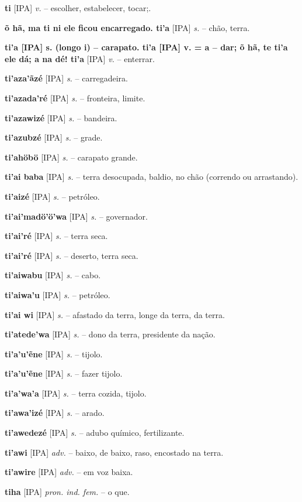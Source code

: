 \textbf{ti} [IPA] \textit{v.} -- escolher, estabelecer, tocar;.

\textbf{õ hã, ma ti ni ele ficou encarregado. ti'a} [IPA] \textit{s.} -- chão, terra.

\textbf{ti'a [IPA] s. (longo i) -- carapato. ti'a [IPA]  v. = a -- dar; õ hã, te ti'a ele dá; a na dé! ti'a} [IPA] \textit{v.} -- enterrar.

\textbf{ti'aza'ãzé} [IPA] \textit{s.} -- carregadeira.

\textbf{ti'azada'ré} [IPA] \textit{s.} -- fronteira, limite.

\textbf{ti'azawizé} [IPA] \textit{s.} -- bandeira.

\textbf{ti'azubzé} [IPA] \textit{s.} -- grade.

\textbf{ti'ahöbö} [IPA] \textit{s.} -- carapato grande.

\textbf{ti'ai baba} [IPA] \textit{s.} -- terra desocupada, baldio, no chão (correndo ou arrastando).

\textbf{ti'aizé} [IPA] \textit{s.} -- petróleo.

\textbf{ti'ai'madö'ö'wa} [IPA] \textit{s.} -- governador.

\textbf{ti'ai'ré} [IPA] \textit{s.} -- terra seca.

\textbf{ti'ai'ré} [IPA] \textit{s.} -- deserto, terra seca.

\textbf{ti'aiwabu} [IPA] \textit{s.} -- cabo.

\textbf{ti'aiwa'u} [IPA] \textit{s.} -- petróleo.

\textbf{ti'ai wi} [IPA] \textit{s.} -- afastado da terra, longe da terra, da terra.

\textbf{ti'atede'wa} [IPA] \textit{s.} -- dono da terra, presidente da nação.

\textbf{ti'a'u'ẽne} [IPA] \textit{s.} -- tijolo.

\textbf{ti'a'u'ẽne} [IPA] \textit{s.} -- fazer tijolo.

\textbf{ti'a'wa'a} [IPA] \textit{s.} -- terra cozida, tijolo.

\textbf{ti'awa'izé} [IPA] \textit{s.} -- arado.

\textbf{ti'awedezé} [IPA] \textit{s.} -- adubo químico, fertilizante.

\textbf{ti'awi} [IPA] \textit{adv.} -- baixo, de baixo, raso, encostado na terra.

\textbf{ti'awire} [IPA] \textit{adv.} -- em voz baixa.

\textbf{tiha} [IPA] \textit{pron. ind. fem.} -- o que.

